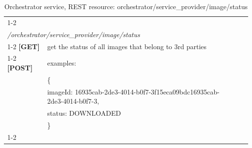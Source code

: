 \begin{table}[H] %
\centering
\begin{tabular}{|l|l|lll}
\cline{1-2}
\multicolumn{2}{|l|}{{\ul }}                                                                  &  &  &  \\
\multicolumn{2}{|l|}{\textit{/orchestrator/service\_provider/image/status}}                   &  &  &  \\ \cline{1-2}
\textbf{{[}GET{]}}  & get the status of all images that belong to 3rd parties                 &  &  &  \\ \cline{1-2}
\textbf{{[}POST{]}} & examples:                                                               &  &  &  \\
                    & \{                                                                      &  &  &  \\
                    & imageId: 16935cab-2de3-4014-b0f7-3f15eca09bdc16935cab-2de3-4014-b0f7-3, &  &  &  \\
                    & status: DOWNLOADED                                                      &  &  &  \\
                    & \}                                                                      &  &  &  \\ \cline{1-2}
\end{tabular}
\caption{Orchestrator service, REST resource:  orchestrator/service\_provider/image/status}
\end{table}
